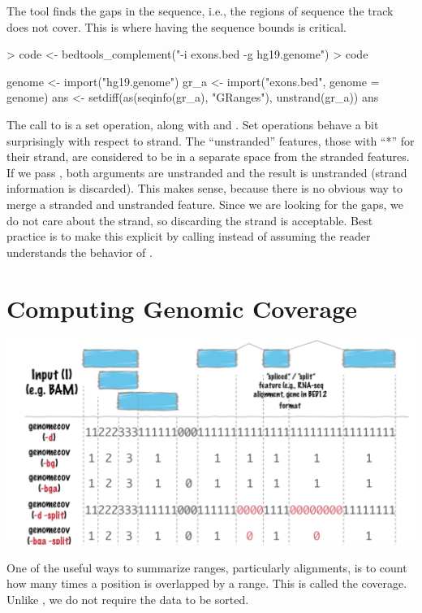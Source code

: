 \documentclass[10pt]{article}
\begin{document}
The  tool finds the gaps in the
sequence, i.e., the regions of sequence the track does not cover. This
is where having the sequence bounds is critical.

\begin{Schunk}
\begin{Sinput}
> code <- bedtools_complement("-i exons.bed -g hg19.genome")
> code
\end{Sinput}
\begin{Soutput}
{
    genome <- import("hg19.genome")
    gr_a <- import("exons.bed", genome = genome)
    ans <- setdiff(as(seqinfo(gr_a), "GRanges"), unstrand(gr_a))
    ans
}
\end{Soutput}
\end{Schunk}

The call to  is a set operation, along with
 and . Set operations behave a
bit surprisingly with respect to strand. The ``unstranded'' features,
those with ``*'' for their strand, are considered to be in a separate
space from the stranded features. If we pass
, both arguments are unstranded and the
result is unstranded (strand information is discarded). This makes
sense, because there is no obvious way to merge a stranded and
unstranded feature. Since we are looking for the gaps, we do not care
about the strand, so discarding the strand is acceptable. Best
practice is to make this explicit by calling 
instead of assuming the reader understands the behavior of
.

\section{Computing Genomic Coverage}
\includegraphics{fig/genomecov.jpg}

One of the useful ways to summarize ranges, particularly alignments,
is to count how many times a position is overlapped by a range. This
is called the coverage. Unlike , we do
not require the data to be sorted.
\end{document}
